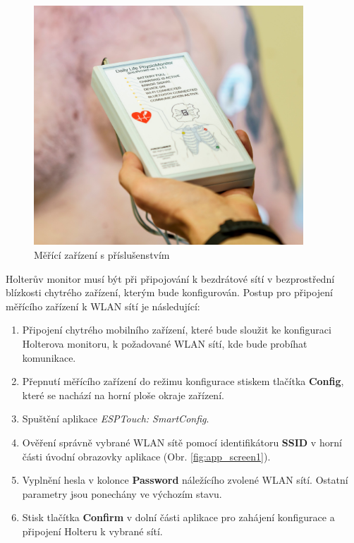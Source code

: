 \begin{figure}[H]
    \begin{center}
        \includegraphics[width=0.9\textwidth]{../assets/device/holter1}
        \caption{Měřící zařízení s příslušenstvím}
        \label{fig:device}
    \end{center}
\end{figure}

Holterův monitor musí být při připojování k bezdrátové sítí v bezprostřední
blízkosti chytrého zařízení, kterým bude konfigurován. Postup pro připojení
měřícího zařízení k WLAN sítí je následující:
\begin{enumerate}
    \item Připojení chytrého mobilního zařízení, které bude sloužit ke
          konfiguraci Holterova monitoru, k požadované WLAN sítí, kde bude
          probíhat komunikace.
    \item Přepnutí měřícího zařízení do režimu konfigurace stiskem tlačítka
          \textbf{Config}, které se nachází na horní ploše okraje zařízení.
    \item Spuštění aplikace \textit{ESPTouch: SmartConfig}.
    \item Ověření správně vybrané WLAN sítě pomocí identifikátoru \textbf{SSID}
          v horní části úvodní obrazovky aplikace (Obr. \ref{fig:app_screen1}).
    \item Vyplnění hesla v kolonce \textbf{Password} náležícího zvolené WLAN
          sítí. Ostatní parametry jsou ponechány ve výchozím stavu.
    \item Stisk tlačítka \textbf{Confirm} v dolní části aplikace pro zahájení
          konfigurace a připojení Holteru k vybrané sítí.
\end{enumerate}


